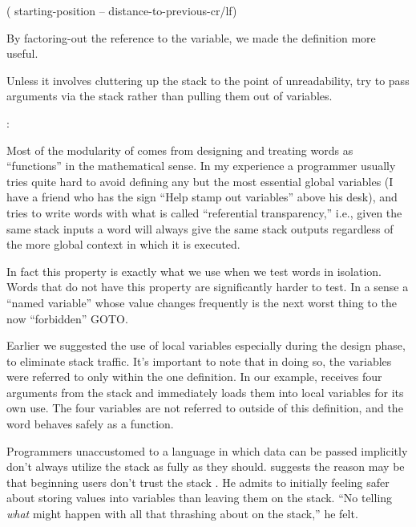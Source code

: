 \begin{Code}
( starting-position -- distance-to-previous-cr/lf)
\end{Code}
By factoring-out the reference to the variable, we made the definition
more useful.

\begin{tip}
Unless it involves cluttering up the stack to the point of unreadability,
try to pass arguments via the stack rather than pulling them out of
variables.
\end{tip}

\begin{interview}
:
\begin{tfquot}
Most of the modularity of \Forth{} comes from designing and treating
\Forth{} words as ``functions'' in the mathematical sense. In my
experience a \Forth{} programmer usually tries quite hard to avoid
defining any but the most essential global variables (I have a friend who
has the sign ``Help stamp out variables'' above his desk), and tries to
write words with what is called ``referential transparency,'' i.e., given
the same stack inputs a word will always give the same stack outputs
regardless of the more global context in which it is executed.

In fact this property is exactly what we use when we test words in
isolation.  Words that do not have this property are significantly harder
to test. In a sense a ``named variable'' whose value changes frequently is
the next worst thing to the now ``forbidden'' GOTO.
\end{tfquot}
\end{interview}


\noindent Earlier we suggested the use of local variables especially
during the design phase, to eliminate stack traffic. It's important to
note that in doing so, the variables were referred to only within the one
definition.  In our example, \forth{[BOX]} receives four arguments from
the stack and immediately loads them into local variables for its own use.
The four variables are not referred to outside of this definition, and the
word behaves safely as a function.

Programmers unaccustomed to a language in which data can be passed
implicitly don't always utilize the stack as fully as they should.
suggests the reason may be that beginning \Forth{} users
don't trust the stack \cite{ham83}. He admits to initially feeling
safer about storing values into variables than leaving them on the
stack. ``No telling \emph{what} might happen with all that thrashing
about on the stack,'' he felt.

